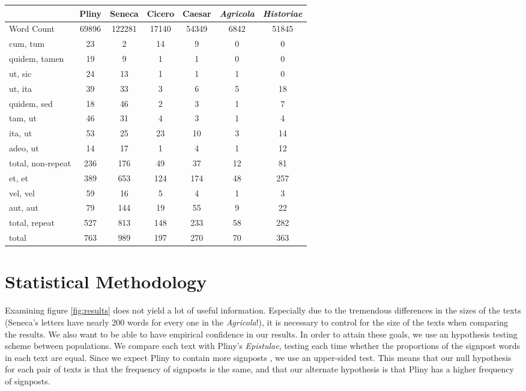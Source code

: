 \begin{figure*}[t]
  \begin{center}
    \begin{tabular}{| l || c | c | c | c | c | c |}
      \hline
      & Pliny & Seneca & Cicero & Caesar & \textit{Agricola} & \textit{Historiae}  \\ \hline \hline
      Word Count & 69896 & 122281 & 17140 & 54349 & 6842 & 51845 \\ \hline \hline
      cum, tum & 23 & 2 & 14 & 9 & 0 & 0 \\ \hline
      quidem, tamen & 19 & 9 & 1 & 1 & 0 & 0 \\ \hline
      ut, sic & 24 & 13 & 1 & 1 & 1 & 0 \\ \hline
      ut, ita & 39 & 33 & 3 & 6 & 5 & 18 \\ \hline
      quidem, sed & 18 & 46 & 2 & 3 & 1 & 7 \\ \hline
      tam, ut & 46 & 31 & 4 & 3 & 1 & 4 \\ \hline
      ita, ut & 53 & 25 & 23 & 10 & 3 & 14 \\ \hline
      adeo, ut & 14 & 17 & 1 & 4 & 1 & 12 \\ \hline \hline
      total, non-repeat & 236 & 176 & 49 & 37 & 12 & 81 \\ \hline \hline
      et, et & 389 & 653 & 124 & 174 & 48 & 257 \\ \hline
      vel, vel & 59 & 16 & 5 & 4 & 1 & 3 \\ \hline
      aut, aut & 79 & 144 & 19 & 55 & 9 & 22 \\ \hline \hline
      total, repeat & 527 & 813 & 148 & 233 & 58 & 282 \\ \hline \hline
      total & 763 & 989 & 197 & 270 & 70 & 363 \\
      \hline
    \end{tabular}
  \end{center}
  \caption{\label{fig:results}This table contains the raw results obtained by running the algorithm described in section \ref{sec:The Program}.}
\end{figure*}

\section{Statistical Methodology}
\label{sec:stats}

Examining figure \ref{fig:results} does not yield a lot of useful information. Especially due to the tremendous differences in the sizes of the texts (Seneca's letters have nearly 200 words for every one in the \textit{Agricola}!), it is necessary to control for the size of the texts when comparing the results. We also want to be able to have empirical confidence in our results. In order to attain these goals, we use an hypothesis testing scheme between populations. We compare each text with Pliny's \textit{Epistulae}, testing each time whether the proportions of the signpost words in each text are equal. Since we expect Pliny to contain more signposts \cite{Woodmanpm}, we use an upper-sided test. This means that our null hypothesis for each pair of texts is that the frequency of signposts is the same, and that our alternate hypothesis is that Pliny has a higher frequency of signposts.

